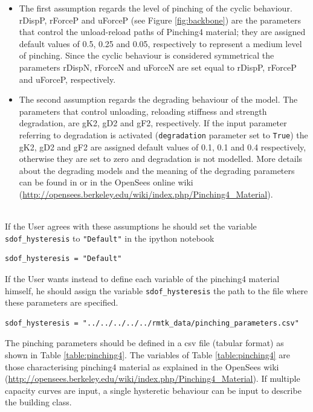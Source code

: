 \begin{itemize}
\item The first assumption regards the level of pinching of the cyclic behaviour. rDispP, rForceP and uForceP (see Figure \ref{fig:backbone}) are the parameters that control the unload-reload paths of Pinching4 material; they are assigned default values of 0.5, 0.25 and 0.05, respectively to represent a medium level of pinching. Since the cyclic behaviour is considered symmetrical the parameters rDispN, rForceN and uForceN are set equal to rDispP, rForceP and uForceP, respectively.
\item The second assumption regards the degrading behaviour of the model. The parameters that control unloading, reloading stiffness and strength degradation, are gK2, gD2 and gF2, respectively. If the input parameter referring to degradation is activated (\verb=degradation= parameter set to \verb=True=) the gK2, gD2 and gF2 are assigned default values of 0.1, 0.1 and 0.4 respectively, otherwise they are set to zero and degradation is not modelled. More details about the degrading models and the meaning of the degrading parameters can be found in \citep{LowesEtAl2003} or in the OpenSees online wiki (\href{http://opensees.berkeley.edu/wiki/index.php/Pinching4_Material}{http://opensees.berkeley.edu/wiki/index.php/Pinching4\_Material}).
\end{itemize}
\\
If the User agrees with these assumptions he should set the variable \verb=sdof_hysteresis= to \verb="Default"= in the ipython notebook

\begin{Verbatim}[frame=single, commandchars=\\\{\}, samepage=true]
sdof_hysteresis = "Default"
\end{Verbatim}

If the User wants instead to define each variable of the pinching4 material himself, he should assign the variable \verb=sdof_hysteresis= the path to the file where these parameters are specified.

\begin{Verbatim}[frame=single, commandchars=\\\{\}, samepage=true]
sdof_hysteresis = "../../../../../rmtk_data/pinching_parameters.csv"
\end{Verbatim}

The pinching parameters should be defined in a csv file (tabular format) as shown in Table \ref{table:pinching4}. The variables of Table \ref{table:pinching4} are those characterising pinching4 material as explained in the OpenSees wiki (\href{http://opensees.berkeley.edu/wiki/index.php/Pinching4_Material}{http://opensees.berkeley.edu/wiki/index.php/Pinching4\_Material}). If multiple capacity curves are input, a single hysteretic behaviour can be input to describe the building class.\\

